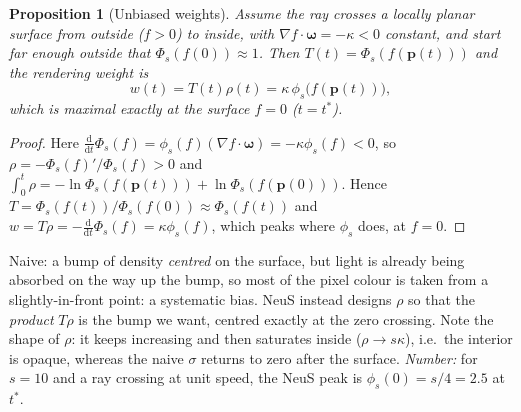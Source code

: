\documentclass[11pt,a4paper]{article}
\newcommand{\bp}{{\bm{p}}}
\newcommand{\bom}{{\bm{\omega}}}
\theoremstyle{definition}
\theoremstyle{plain}
\newtheorem{proposition}[definition]{Proposition}
\theoremstyle{remark}
\begin{document}
\begin{proposition}[Unbiased weights]\label{prop:unbiased}
Assume the ray crosses a locally planar surface from outside ($f>0$) to inside, with $\nabla f\cdot\bom=-\kappa<0$ constant,
and start far enough outside that $\Phi_s(f(0))\approx1$. Then $T(t)=\Phi_s(f(\bp(t)))$ and the rendering weight is
\[
w(t)=T(t)\rho(t)=\kappa\,\phi_s\bigl(f(\bp(t))\bigr),
\]
which is maximal exactly at the surface $f=0$ ($t=t^*$).
\end{proposition}
\begin{proof}
Here $\frac{\mathrm d}{\mathrm dt}\Phi_s(f)=\phi_s(f)(\nabla f\cdot\bom)=-\kappa\phi_s(f)<0$, so $\rho=-\Phi_s(f)'/\Phi_s(f)>0$ and
$\int_0^t\rho=-\ln\Phi_s(f(\bp(t)))+\ln\Phi_s(f(\bp(0)))$. Hence $T=\Phi_s(f(t))/\Phi_s(f(0))\approx\Phi_s(f(t))$ and
$w=T\rho=-\frac{\mathrm d}{\mathrm dt}\Phi_s(f)=\kappa\phi_s(f)$, which peaks where $\phi_s$ does, at $f=0$.
\end{proof}
\begin{intuition}
Naive: a bump of density \emph{centred} on the surface, but light is already being absorbed on the way up the bump, so
most of the pixel colour is taken from a slightly-in-front point: a systematic bias. NeuS instead designs $\rho$ so that
the \emph{product} $T\rho$ is the bump we want, centred exactly at the zero crossing. Note the shape of $\rho$: it keeps
increasing and then saturates inside ($\rho\to s\kappa$), i.e.\ the interior is opaque, whereas the naive $\sigma$ returns to zero after the surface.
\emph{Number:} for $s=10$ and a ray crossing at unit speed, the NeuS peak is $\phi_s(0)=s/4=2.5$ at $t^*$.
\end{intuition}
\end{document}
